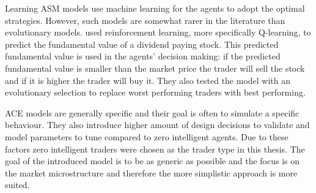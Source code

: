 Learning ASM models use machine learning for the agents to adopt the optimal strategies.
However, such models are somewhat rarer in the literature than evolutionary
models. \citet{Reinforcement09} used reinforcement 
learning, more specifically Q-learning, to predict the fundamental value of a 
dividend paying stock. This predicted fundamental value is used in the agents' 
decision making: if the predicted fundamental value is smaller than the market price
the trader will sell the stock and if it is higher the trader will buy it. They 
also tested the model with an evolutionary selection to replace worst performing
traders with best performing.





ACE models are generally specific and their goal is often to simulate a specific behaviour.
They also introduce higher amount of design decisions to validate and model parameters 
to tune compared to zero intelligent agents. Due to these factors zero intelligent traders
were chosen as the trader type in this thesis. The goal of the introduced model is to be as 
generic as possible and the focus is on the market microstructure and therefore the more 
simplistic approach is more suited.